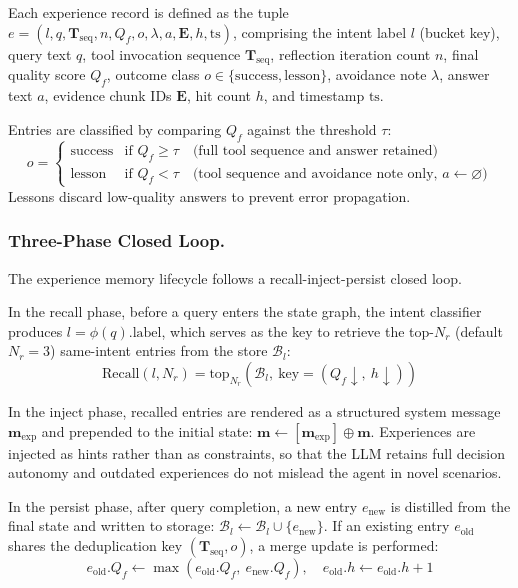 \documentclass[runningheads]{llncs}
\begin{document}
Each experience record is defined as the tuple $e = (l, q, \mathbf{T}_{\text{seq}}, n, Q_f, o, \lambda, a, \mathbf{E}, h, \text{ts})$, comprising the intent label $l$ (bucket key), query text $q$, tool invocation sequence $\mathbf{T}_{\text{seq}}$, reflection iteration count $n$, final quality score $Q_f$, outcome class $o \in \{\text{success}, \text{lesson}\}$, avoidance note $\lambda$, answer text $a$, evidence chunk IDs $\mathbf{E}$, hit count $h$, and timestamp $\text{ts}$.

Entries are classified by comparing $Q_f$ against the threshold $\tau$:
\begin{equation}
    o = \begin{cases}
    \text{success} & \text{if } Q_f \geq \tau \quad \text{(full tool sequence and answer retained)} \\
    \text{lesson} & \text{if } Q_f < \tau \quad \text{(tool sequence and avoidance note only, } a \leftarrow \varnothing\text{)}
    \end{cases}
\end{equation}
Lessons discard low-quality answers to prevent error propagation.

\subsubsection{Three-Phase Closed Loop.}

The experience memory lifecycle follows a recall-inject-persist closed loop.

In the recall phase, before a query enters the state graph, the intent classifier produces $l = \phi(q).\text{label}$, which serves as the key to retrieve the top-$N_r$ (default $N_r = 3$) same-intent entries from the store $\mathcal{B}_l$:\begin{equation}
    \text{Recall}(l, N_r) = \text{top}_{N_r}\!\left(\mathcal{B}_l,\ \text{key} = (Q_f \downarrow,\ h \downarrow)\right)
\end{equation}

In the inject phase, recalled entries are rendered as a structured system message $\mathbf{m}_{\text{exp}}$ and prepended to the initial state: $\mathbf{m} \leftarrow [\mathbf{m}_{\text{exp}}] \oplus \mathbf{m}$. Experiences are injected as hints rather than as constraints, so that the LLM retains full decision autonomy and outdated experiences do not mislead the agent in novel scenarios.

In the persist phase, after query completion, a new entry $e_{\text{new}}$ is distilled from the final state and written to storage: $\mathcal{B}_l \leftarrow \mathcal{B}_l \cup \{e_{\text{new}}\}$. If an existing entry $e_{\text{old}}$ shares the deduplication key $(\mathbf{T}_{\text{seq}}, o)$, a merge update is performed:
\begin{equation}
    e_{\text{old}}.Q_f \leftarrow \max(e_{\text{old}}.Q_f,\ e_{\text{new}}.Q_f), \quad e_{\text{old}}.h \leftarrow e_{\text{old}}.h + 1
\end{equation}
\end{document}
